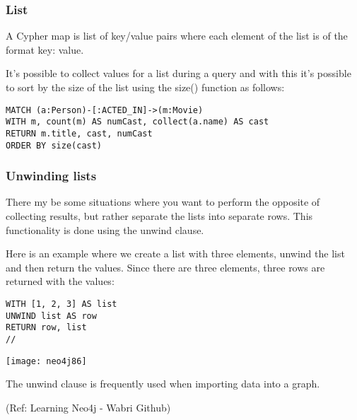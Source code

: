 \begin{frame}[fragile]\frametitle{List}

A Cypher map is list of key/value pairs where each element of the list is of the format key: value.

It's possible to collect values for a list during a query and with this it's possible to sort by the size of the list using the size() function as follows:

\begin{lstlisting}
MATCH (a:Person)-[:ACTED_IN]->(m:Movie)
WITH m, count(m) AS numCast, collect(a.name) AS cast
RETURN m.title, cast, numCast
ORDER BY size(cast)
\end{lstlisting}


\end{frame}



\begin{frame}[fragile]\frametitle{Unwinding lists}

There my be some situations where you want to perform the opposite of collecting results, but rather separate the lists into separate rows. This functionality is done using the unwind clause.

Here is an example where we create a list with three elements, unwind the list and then return the values. Since there are three elements, three rows are returned with the values:

\begin{lstlisting}
WITH [1, 2, 3] AS list
UNWIND list AS row
RETURN row, list
//
\end{lstlisting}


\begin{center}
\texttt{[image: neo4j86]}
\end{center}	 

The unwind clause is frequently used when importing data into a graph.

 

{\tiny (Ref: Learning Neo4j - Wabri Github)}
\end{frame}

